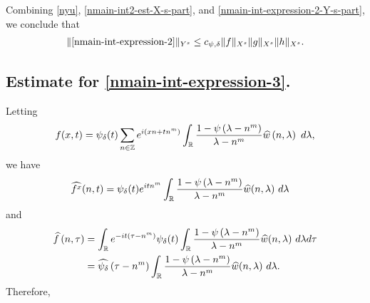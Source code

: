 %
%
Combining \eqref{nyu}, \eqref{nmain-int2-est-X-s-part}, and
\eqref{nmain-int-expression-2-Y-s-part}, we conclude that
%
%
%
%
\begin{equation}
	\label{nmain-int2-est}
	\begin{split}
		\|\eqref{nmain-int-expression-2}\|_{Y^s} \le c_{\psi, \delta}\|f\|_{X^s} \|g\|_{X^s}\|h\|_{X^s}.
	\end{split}
\end{equation}
%
%
\subsection{Estimate for \eqref{nmain-int-expression-3}.}
Letting $$f(x,t) = \psi_{\delta}(t) \sum_{n \in \mathbb{Z}} e^{i\left( xn + tn^{m} \right)} 
\int_{\mathbb{R}} \frac{1 - \psi\left( \lambda - n^{m} \right)}{\lambda - n^{m}} 
\widehat{w} \left( n, \lambda \right) \ d \lambda,$$ we have
%
%
\begin{equation*}
	\begin{split}
		& \widehat{f^x}(n, t) = \psi_{\delta}(t) e^{itn^{m}} \int_{\mathbb{R}}
		\frac{1 - \psi\left( \lambda - n^{m} \right)}{\lambda - n^{m}} 
		\widehat{w}(n, \lambda) \ d \lambda
	\end{split}
\end{equation*}
and
\begin{equation*}
	\begin{split}
		 \widehat{f}\left( n, \tau \right)
		 & = \int_{\mathbb{R}} e^{-it\left( \tau - n^{m} 
		\right)} \psi_{\delta}(t) \int_{\mathbb{R}} \frac{1 - \psi\left( 
		\lambda - n^{m} 
		\right)}{\lambda - n^{m}} \widehat{w}(n, \lambda) \ d \lambda d \tau
		\\
    & = \widehat{\psi_{\delta}}\left( \tau - n^{m} \right) \int_{\mathbb{R}} 
		\frac{1 - \psi\left( 
		\lambda - n^{m} 
		\right)}{\lambda - n^{m}} \widehat{w}(n, \lambda) \ d \lambda.
	\end{split}
\end{equation*}
Therefore,
%
%
